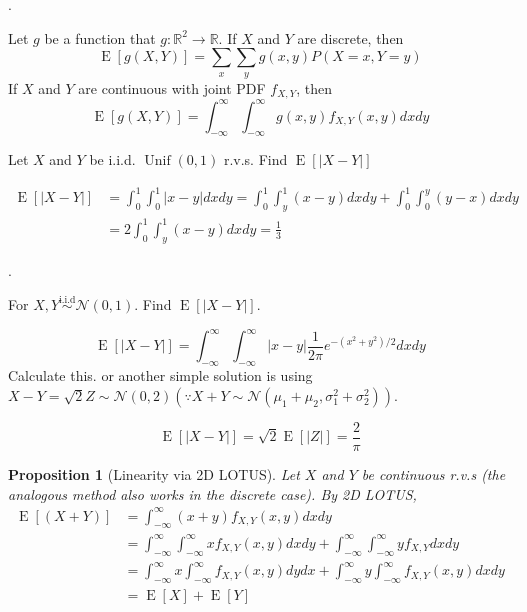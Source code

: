 \documentclass[8pt]{beamer}
\newtheorem{proposition}[theorem]{Proposition}
\newcommand{\mbb}[1]{\mathbb{#1}}
\newcommand{\mc}[1]{\mathcal{#1}}
\newcommand{\myunif}[2]{\operatorname{Unif}\!\left(#1, #2\right)}
\newcommand{\abs}[1]{\left\lvert #1 \right\rvert}
\newcommand{\expec}[1]{\operatorname{E}\left[ #1 \right]}
\begin{document}
\begin{frame}{.}
    \begin{theorem}[2D LOTUS]
        Let $g$ be a function that $g: \mbb{R}^2 \rightarrow \mbb{R}$. If $X$ and $Y$ are discrete, then 
        \[
            \expec{g(X,Y)} = \sum_x \sum_y g(x,y) P(X=x,Y=y)
        \]
        If $X$ and $Y$ are continuous with joint PDF $f_{X,Y}$, then
        \[
            \expec{g(X,Y)} = \int_{-\infty}^\infty \int_{-\infty}^\infty g(x,y) f_{X,Y} (x,y) dx dy
        \]
    \end{theorem}

    \begin{example}
        Let $X$ and $Y$ be i.i.d. $\myunif{0}{1}$ r.v.s. Find $\expec{\abs{X-Y}}$
    \end{example}
    \[
    \begin{aligned}
        \expec{\abs{X-Y}} &= \int_0^1 \int_0^1 \abs{x-y} dx dy = \int_0^1 \int_y^1 (x-y)dx dy + \int_0^1 \int_0^y (y-x) dx dy \\
        &= 2 \int_0^1 \int_y^1 (x-y) dx dy = \frac{1}{3}
    \end{aligned}
    \]

\end{frame}

\begin{frame}{.}
    \begin{example}
        For $X, Y \overset{\text{i.i.d}}{\sim} \mc{N}(0,1)$. Find $\expec{\abs{X-Y}}$.
    \end{example}
    \[
    \expec{\abs{X-Y}} = \int_{-\infty}^\infty \int_{-\infty}^\infty \abs{x-y} \frac{1}{2\pi} e^{-(x^2 +y^2)/2}dxdy
    \]
    Calculate this. or another simple solution is using $X-Y = \sqrt{2}Z \sim \mc{N}(0, 2) (\because X+Y \sim \mc{N}(\mu_1 + \mu_2, \sigma_1^2 + \sigma_2^2)) $.

    \[
        \expec{\abs{X-Y}} = \sqrt{2}\expec{\abs{Z}} = \frac{2}{\pi}
    \]

    \begin{proposition}[Linearity via 2D LOTUS]
        Let $X$ and $Y$ be continuous r.v.s (the analogous method also works in the discrete case). By 2D LOTUS,
        \[
        \begin{aligned}
            \expec{(X+Y)} &= \int_{-\infty}^\infty (x+y)f_{X,Y}(x,y)dx dy \\
            &=\int_{-\infty}^\infty \int_{-\infty}^\infty x f_{X,Y}(x,y) dxdy + \int_{-\infty}^\infty \int_{-\infty}^\infty y f_{X,Y} dxdy \\ 
            &= \int^{\infty}_{-\infty} x \int_{-\infty}^\infty f_{X,Y} (x,y) dy dx + \int_{-\infty}^\infty y \int^{\infty}_{-\infty} f_{X,Y} (x,y) dx dy \\
            &= \expec{X} + \expec{Y}
        \end{aligned}
        \]
    \end{proposition}
\end{frame}
\end{document}

